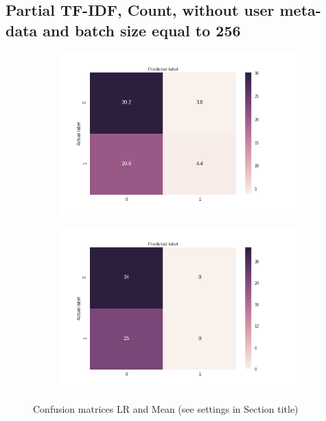 \documentclass[sigconf]{acmart-txmm}
\begin{document}
\subsection{Partial TF-IDF, Count, without user meta-data and batch size equal to 256}
\label{app:b_best}

\begin{figure}[H]
\centering
\begin{subfigure}
  \centering
  \includegraphics[width=1\linewidth]{report/img/conf_matrices/keywords_tfidf_p_count_0_0_256_LR.png}
  \label{fig:keywords_tfidf_p_count_0_0_256_LR}
\end{subfigure}%
\begin{subfigure}
  \centering
  \includegraphics[width=1\linewidth]{report/img/conf_matrices/keywords_tfidf_p_count_0_0_256_mean.png}
  \label{fig:keywords_tfidf_p_count_0_0_256_mean}
\end{subfigure}
\caption{Confusion matrices LR and Mean (see settings in Section title)}
\label{fig:keywords_tfidf_p_count_0_0_256}
\end{figure}
\end{document}
